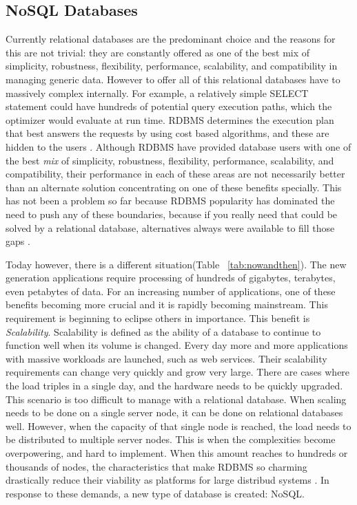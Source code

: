 \documentclass{article}
\begin{document}
\subsection{NoSQL Databases}
Currently relational databases are the predominant choice and the reasons for this are not trivial: they are constantly offered as one of the best mix of simplicity, robustness, flexibility, performance, scalability, and compatibility in managing generic data. However to offer all of this relational databases have to massively complex internally. For example, a relatively simple SELECT statement could have hundreds of potential query execution paths, which the optimizer would evaluate at run time. RDBMS determines the execution plan that best answers the requests by using cost based algorithms, and these are hidden to the users \cite{clouddb4}. Although RDBMS have provided database users with one of the best \emph{mix} of simplicity, robustness, flexibility, performance, scalability, and compatibility, their performance in each of these areas are not necessarily better than an alternate solution concentrating on one of these benefits specially. This has not been a problem so far because RDBMS popularity has dominated the need to push any of these boundaries, because if you really need that could be solved by a relational database, alternatives always were available to fill those gaps \cite{clouddb5}.

Today however, there is a different situation(Table ~\ref{tab:nowandthen}). The new generation applications require processing of hundreds of gigabytes, terabytes, even petabytes of data. For an increasing number of applications, one of these benefits becoming more crucial and it is rapidly becoming mainstream. This requirement is beginning to eclipse others in importance. This benefit is \emph{Scalability}. Scalability is defined as the ability of a database to continue to function well when its volume is changed\cite{online6}. Every day more and more applications with massive workloads are launched, such as web services. Their scalability requirements can change very quickly and grow very large. There are cases where the load triples in a single day, and the hardware needs to be quickly upgraded. This scenario is too difficult to manage with a relational database. When scaling needs to be done on a single server node, it can be done on relational databases well. However, when the capacity of that single node is reached, the load needs to be distributed to multiple server nodes. This is when the complexities become overpowering, and hard to implement. When this amount reaches to hundreds or thousands of nodes, the characteristics that make RDBMS so charming drastically reduce their viability as platforms for large distribud systems \cite{clouddb4}. In response to these demands, a new type of database is created: NoSQL.
\end{document}
